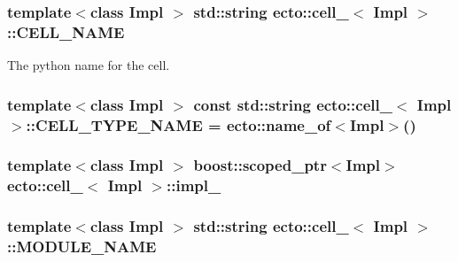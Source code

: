 \subsubsection[{\texorpdfstring{C\+E\+L\+L\+\_\+\+N\+A\+ME}{CELL_NAME}}]{\setlength{\rightskip}{0pt plus 5cm}template$<$class Impl $>$ std\+::string {\bf ecto\+::cell\+\_\+}$<$ Impl $>$\+::C\+E\+L\+L\+\_\+\+N\+A\+ME\hspace{0.3cm}{\ttfamily [static]}}\hypertarget{structecto_1_1cell___aaa9154887542b8d7152f8199e9c6c9bd}{}\label{structecto_1_1cell___aaa9154887542b8d7152f8199e9c6c9bd}


The python name for the cell. 

\subsubsection[{\texorpdfstring{C\+E\+L\+L\+\_\+\+T\+Y\+P\+E\+\_\+\+N\+A\+ME}{CELL_TYPE_NAME}}]{\setlength{\rightskip}{0pt plus 5cm}template$<$class Impl $>$ const std\+::string {\bf ecto\+::cell\+\_\+}$<$ Impl $>$\+::C\+E\+L\+L\+\_\+\+T\+Y\+P\+E\+\_\+\+N\+A\+ME = {\bf ecto\+::name\+\_\+of}$<$Impl$>$()\hspace{0.3cm}{\ttfamily [static]}}\hypertarget{structecto_1_1cell___a26e158738e4e4c8f0ddb64efce30d8d3}{}\label{structecto_1_1cell___a26e158738e4e4c8f0ddb64efce30d8d3}
\subsubsection[{\texorpdfstring{impl\+\_\+}{impl_}}]{\setlength{\rightskip}{0pt plus 5cm}template$<$class Impl $>$ boost\+::scoped\+\_\+ptr$<$Impl$>$ {\bf ecto\+::cell\+\_\+}$<$ Impl $>$\+::impl\+\_\+\hspace{0.3cm}{\ttfamily [private]}}\hypertarget{structecto_1_1cell___a2984b78c1ed24aca6ee427502bd6e8c4}{}\label{structecto_1_1cell___a2984b78c1ed24aca6ee427502bd6e8c4}
\subsubsection[{\texorpdfstring{M\+O\+D\+U\+L\+E\+\_\+\+N\+A\+ME}{MODULE_NAME}}]{\setlength{\rightskip}{0pt plus 5cm}template$<$class Impl $>$ std\+::string {\bf ecto\+::cell\+\_\+}$<$ Impl $>$\+::M\+O\+D\+U\+L\+E\+\_\+\+N\+A\+ME\hspace{0.3cm}{\ttfamily [static]}}\hypertarget{structecto_1_1cell___ab81cf6649132223f620b739a57db04db}{}\label{structecto_1_1cell___ab81cf6649132223f620b739a57db04db}


